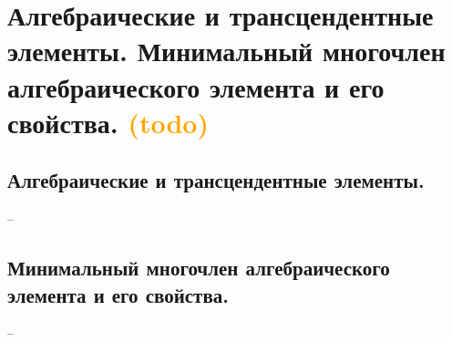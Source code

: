 \section{Алгебраические и трансцендентные элементы. Минимальный многочлен алгебраического элемента и его свойства. \textcolor{orange}{(todo)}}

\subsection{Алгебраические и трансцендентные элементы.}
--

\subsection{Минимальный многочлен алгебраического элемента и его свойства.}
--
